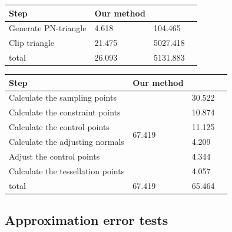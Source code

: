 \documentclass[3p]{elsarticle}
\makeatletter
\newcommand\tabcaption{\def\@captype{table}\caption}
\makeatother
\begin{document}
\begin{minipage}[c]{0.99\textwidth} 
  \centering
  \footnotesize
    \tabcaption{Comparison of the efficiencies of our method and \cite{Cui15}(pre-compute stage)}
  \begin{tabular}{llll}
  	\hline
  	Step & Our method & \cite{Cui15}\\
  	\hline
  	Generate PN-triangle         & 4.618   & 104.465     \\
  	Clip triangle                & 21.475  & 5027.418    \\
  	\hline
  	total                        & 26.093  & 5131.883    \\
  	\hline
  \end{tabular}
    \label{tab:compare_pre}
\end{minipage} 

\begin{minipage}[c]{0.99\textwidth} 
  \centering
  \footnotesize
    \tabcaption{Comparison of the efficiencies of our method and \cite{Cui15}(deform stage)}
  \begin{tabular}{llll}
  	\hline
  	Step & Our method & \cite{Cui15}\\
  	\hline
      Calculate the sampling points     & \multirow{6}{*}{67.419} & 30.522     \\
  	Calculate the constraint points   &   & 10.874     \\
  	Calculate the control points      &   & 11.125     \\
  	Calculate the adjusting normals   &   & 4.209     \\
  	Adjust the control points         &   & 4.344     \\
  	Calculate the tessellation points &   & 4.057     \\
  	\hline
  	total                             & 67.419  & 65.464    \\
  	\hline
  \end{tabular}
  \label{tab:compare_deform}
\end{minipage}

\subsection{Approximation error tests}
\end{document}

